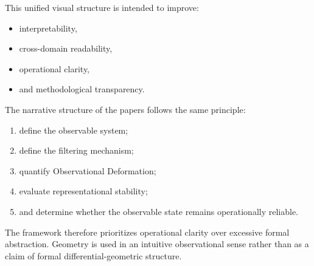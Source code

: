 \documentclass[11pt]{article}
\begin{document}
This unified visual structure is intended to improve:
\begin{itemize}
\item interpretability,
\item cross-domain readability,
\item operational clarity,
\item and methodological transparency.
\end{itemize}

The narrative structure of the papers follows the same principle:
\begin{enumerate}
\item define the observable system;
\item define the filtering mechanism;
\item quantify Observational Deformation;
\item evaluate representational stability;
\item and determine whether the observable state remains operationally reliable.
\end{enumerate}

The framework therefore prioritizes operational clarity over excessive formal abstraction. Geometry is used in an intuitive observational sense rather than as a claim of formal differential-geometric structure.




\maketitle

\begin{abstract}
Modern observational systems rarely access underlying probabilistic structures directly. Instead, observable datasets emerge through Informative Filtering mechanisms such as accessibility constraints, benchmark curation, detector thresholds, post-selection, retrieval pipelines, and response-dependent dropout.

This work introduces the Induced Dependence framework as an operational proposal for studying probabilistic deformation generated by observational filtering. The framework defines a Natural State $D_N \sim P(R)$ and a Filtered Observable State $D_F \sim P(R|F=1)$, and quantifies deformation through probabilistic distances and induced dependence metrics.

Three representative environments are analyzed: Bell-type controlled observational systems, ecological accessibility filtering, and AI benchmark deformation. These environments represent, respectively, a highly controlled conditioning system, a natural observational filtering system, and a dynamic adaptive filtering system.

The framework is operational rather than ontological and is intended as a quantitative language for monitoring observational stability, filtering drift, and corrective sampling under incomplete observability.
\end{abstract}
\end{document}
